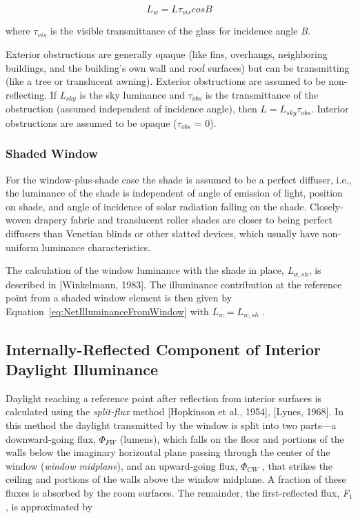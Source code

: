 \begin{equation}
{L_w} = L{\tau_{vis}}cosB
\end{equation}

where \({\tau_{vis}}\) is the visible transmittance of the glass for incidence angle \emph{B}.

Exterior obstructions are generally opaque (like fins, overhangs, neighboring buildings, and the building's own wall and roof surfaces) but can be transmitting (like a tree or translucent awning). Exterior obstructions are assumed to be non-reflecting. If \emph{L\(_{sky}\)} is the sky luminance and \emph{$\tau$\(_{obs}\)} is the transmittance of the obstruction (assumed independent of incidence angle), then \(L = L_{sky} \tau_{obs}\). Interior obstructions are assumed to be opaque ($\tau$\(_{obs}\) = 0).

\subsubsection{Shaded Window}\label{shaded-window}

For the window-plus-shade case the shade is assumed to be a perfect diffuser, i.e., the luminance of the shade is independent of angle of emission of light, position on shade, and angle of incidence of solar radiation falling on the shade. Closely-woven drapery fabric and translucent roller shades are closer to being perfect diffusers than Venetian blinds or other slatted devices, which usually have non-uniform luminance characteristics.

The calculation of the window luminance with the shade in place, \emph{L\(_{w,sh}\)}, is described in {[}Winkelmann, 1983{]}. The illuminance contribution at the reference point from a shaded window element is then given by Equation~\ref{eq:NetIlluminanceFromWindow} with \({L_w} = {L_{w,sh}}\) .

\subsection{Internally-Reflected Component of Interior Daylight Illuminance}\label{internally-reflected-component-of-interior-daylight-illuminance}

Daylight reaching a reference point after reflection from interior surfaces is calculated using the \emph{split-flux} method {[}Hopkinson et al., 1954{]}, {[}Lynes, 1968{]}. In this method the daylight transmitted by the window is split into two parts---a downward-going flux, \({\Phi_{FW}}\) (lumens), which falls on the floor and portions of the walls below the imaginary horizontal plane passing through the center of the window (\emph{window midplane}), and an upward-going flux, \({\Phi_{CW}}\) , that strikes the ceiling and portions of the walls above the window midplane. A fraction of these fluxes is absorbed by the room surfaces. The remainder, the first-reflected flux, \emph{F\(_{1}\)}, is approximated by

